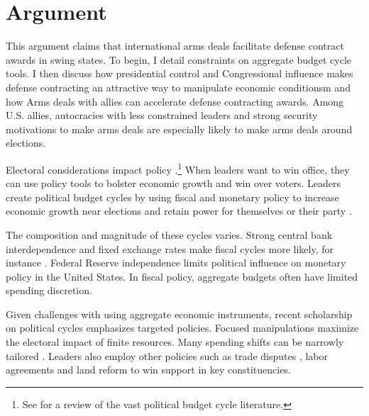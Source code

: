 \documentclass[12pt]{article}
\begin{document}
\section{Argument}


This argument claims that international arms deals facilitate defense contract awards in swing states.
To begin, I detail constraints on aggregate budget cycle tools.
I then discuss how presidential control and Congressional influence makes defense contracting an attractive way to manipulate economic conditionsm and how Arms deals with allies can accelerate defense contracting awards. 
Among U.S. allies, autocracies with less constrained leaders and strong security motivations to make arms deals are especially likely to make arms deals around elections.


Electoral considerations impact policy \citep{Nordhaus1975}.\footnote{See \citet{Dubois2016} for a review of the vast political budget cycle literature.} 
When leaders want to win office, they can use policy tools to bolster economic growth and win over voters. 
Leaders create political budget cycles by using fiscal and monetary policy to increase economic growth near elections and retain power for themselves or their party \citep{Tufte1978, Rogoff1987}. 


The composition and magnitude of these cycles varies. 
Strong central bank interdependence and fixed exchange rates make fiscal cycles more likely, for instance \citep{ClarkHallerberg2000}. 
Federal Reserve independence limits political influence on monetary policy in the United States. %
In fiscal policy, aggregate budgets often have limited spending discretion.


Given challenges with using aggregate economic instruments, recent scholarship on political cycles emphasizes targeted policies.
Focused manipulations maximize the electoral impact of finite resources.
Many spending shifts can be narrowly tailored \citep[pg. 248]{Dubois2016}.
Leaders also employ other policies such as trade disputes \citep{Conconietal2017}, labor agreements \citep{Ahlquist2010} and land reform \citep{Philips2020} to win support in key constituencies.
\end{document}
